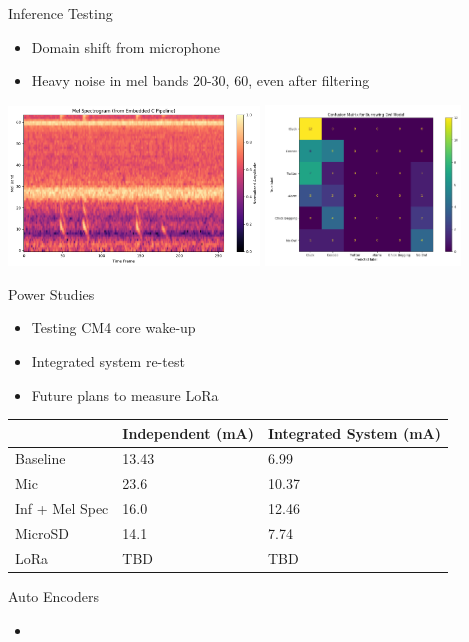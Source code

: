 \begin{frame}{Inference Testing}
    \begin{itemize}
        \item Domain shift from microphone 
        \item Heavy noise in mel bands 20-30, 60, even after filtering
    \end{itemize}
    \includegraphics[height=0.7\textheight,width=0.5\textwidth,keepaspectratio]{images/melSpec.png}
    \includegraphics[height=0.7\textheight,width=0.39\textwidth,keepaspectratio]{images/confusionMatrix.png}
\end{frame}

\begin{frame}{Power Studies}
    \begin{itemize}
        \item Testing CM4 core wake-up
        \item Integrated system re-test
        \item Future plans to measure LoRa
    \end{itemize}
    \begin{table}[]
    \begin{tabular}{lll}
    \hline
                & Independent (mA) & Integrated System (mA) \\ \hline
    Baseline       & 13.43            & 6.99                  \\
    Mic            & 23.6             & 10.37                 \\
    Inf + Mel Spec & 16.0             & 12.46                 \\
    MicroSD        & 14.1             & 7.74                  \\
    LoRa          & TBD              & TBD                     \\ \hline
    \end{tabular}
    \end{table}
\end{frame}

\begin{frame}{Auto Encoders}
    \begin{itemize}
        \item 
    \end{itemize}
\end{frame}




